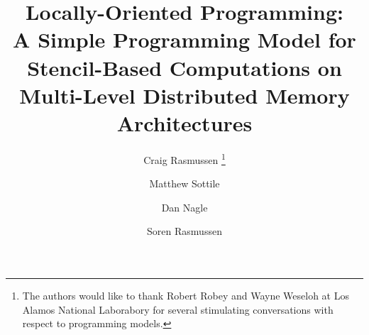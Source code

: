 \documentclass[runningheads,a4paper]{llncs}
\begin{document}
\mainmatter  %

\title{Locally-Oriented Programming:\\ A Simple Programming Model for Stencil-Based Computations
       on Multi-Level Distributed Memory Architectures}


\author{Craig Rasmussen%
\thanks{The authors would like to thank Robert Robey and Wayne Weseloh
at Los Alamos National Laborabory for several stimulating
conversations with respect to programming models.}%
\and Matthew Sottile\and Dan Nagle\and Soren Rasmussen}



%
%

\maketitle
\end{document}
